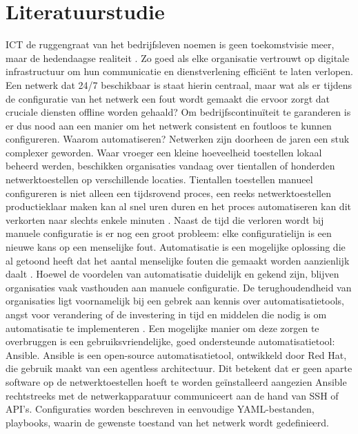 
\section{Literatuurstudie}%
\label{sec:literatuurstudie}

ICT de ruggengraat van het bedrijfsleven noemen is geen toekomstvisie meer, maar de hedendaagse realiteit \autocite{OlalereAbiodun2023}. 
Zo goed als elke organisatie vertrouwt op digitale infrastructuur om hun communicatie en dienstverlening efficiënt te laten verlopen.
Een netwerk dat 24/7 beschikbaar is staat hierin centraal, maar wat als er tijdens de configuratie van het netwerk een fout wordt gemaakt die ervoor zorgt dat cruciale diensten offline worden gehaald?
Om bedrijfscontinuïteit te garanderen is er dus nood aan een manier om het netwerk consistent en foutloos te kunnen configureren.
Waarom automatiseren? Netwerken zijn doorheen de jaren een stuk complexer geworden. Waar vroeger een kleine hoeveelheid toestellen lokaal beheerd werden, beschikken organisaties vandaag over tientallen of honderden netwerktoestellen op verschillende locaties. 
Tientallen toestellen manueel configureren is niet alleen een tijdsrovend proces, een reeks netwerktoestellen productieklaar maken kan al snel uren duren en het proces automatiseren kan dit verkorten naar slechts enkele minuten \autocite{Younes2024}.
Naast de tijd die verloren wordt bij manuele configuratie is er nog een groot probleem: elke configuratielijn is een nieuwe kans op een menselijke fout. 
Automatisatie is een mogelijke oplossing die al getoond heeft dat het aantal menselijke fouten die gemaakt worden aanzienlijk daalt \autocite{Diekmann_2015}.
Hoewel de voordelen van automatisatie duidelijk en gekend zijn, blijven organisaties vaak vasthouden aan manuele configuratie. 
De terughoudendheid van organisaties ligt voornamelijk bij een gebrek aan kennis over automatisatietools, angst voor verandering of de investering in tijd en middelen die nodig is om automatisatie te implementeren \autocite{EMAItential2021}.
Een mogelijke manier om deze zorgen te overbruggen is een gebruiksvriendelijke, goed ondersteunde automatisatietool: Ansible.
Ansible is een open-source automatisatietool, ontwikkeld door Red Hat, die gebruik maakt van een agentless architectuur.
Dit betekent dat er geen aparte software op de netwerktoestellen hoeft te worden geïnstalleerd aangezien Ansible rechtstreeks met de netwerkapparatuur communiceert aan de hand van SSH of API’s. Configuraties worden beschreven in eenvoudige YAML-bestanden, playbooks, waarin de gewenste toestand van het netwerk wordt gedefinieerd.
